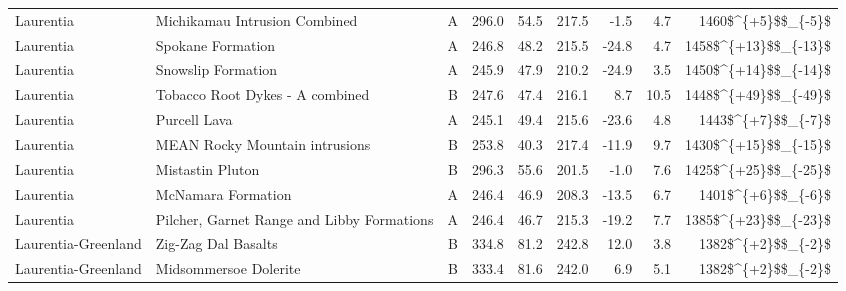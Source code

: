 \begin{longtable}{p{1 in}p{1 in}rrrrrrr}
                     Laurentia &                      Michikamau Intrusion Combined &      A &     296.0 &      54.5 & 217.5 &  -1.5 &       4.7 &     1460\$\textasciicircum \{+5\}\$\$\_\{-5\}\$ \\
                     Laurentia &                                  Spokane Formation &      A &     246.8 &      48.2 & 215.5 & -24.8 &       4.7 &   1458\$\textasciicircum \{+13\}\$\$\_\{-13\}\$ \\
                     Laurentia &                                 Snowslip Formation &      A &     245.9 &      47.9 & 210.2 & -24.9 &       3.5 &   1450\$\textasciicircum \{+14\}\$\$\_\{-14\}\$ \\
                     Laurentia &                    Tobacco Root Dykes - A combined &      B &     247.6 &      47.4 & 216.1 &   8.7 &      10.5 &   1448\$\textasciicircum \{+49\}\$\$\_\{-49\}\$ \\
                     Laurentia &                                       Purcell Lava &      A &     245.1 &      49.4 & 215.6 & -23.6 &       4.8 &     1443\$\textasciicircum \{+7\}\$\$\_\{-7\}\$ \\
                     Laurentia &                     MEAN Rocky Mountain intrusions &      B &     253.8 &      40.3 & 217.4 & -11.9 &       9.7 &   1430\$\textasciicircum \{+15\}\$\$\_\{-15\}\$ \\
                     Laurentia &                                   Mistastin Pluton &      B &     296.3 &      55.6 & 201.5 &  -1.0 &       7.6 &   1425\$\textasciicircum \{+25\}\$\$\_\{-25\}\$ \\
                     Laurentia &                                 McNamara Formation &      A &     246.4 &      46.9 & 208.3 & -13.5 &       6.7 &     1401\$\textasciicircum \{+6\}\$\$\_\{-6\}\$ \\
                     Laurentia &         Pilcher, Garnet Range and Libby Formations &      A &     246.4 &      46.7 & 215.3 & -19.2 &       7.7 &   1385\$\textasciicircum \{+23\}\$\$\_\{-23\}\$ \\
           Laurentia-Greenland &                                Zig-Zag Dal Basalts &      B &     334.8 &      81.2 & 242.8 &  12.0 &       3.8 &     1382\$\textasciicircum \{+2\}\$\$\_\{-2\}\$ \\
           Laurentia-Greenland &                              Midsommersoe Dolerite &      B &     333.4 &      81.6 & 242.0 &   6.9 &       5.1 &     1382\$\textasciicircum \{+2\}\$\$\_\{-2\}\$ \\

\end{longtable}
